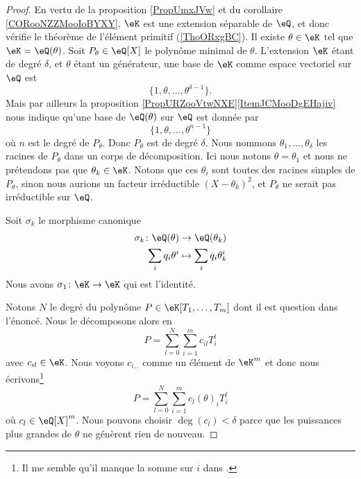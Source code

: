 \begin{proof}
    En vertu de la proposition \ref{PropUmxJVw} et du corollaire \ref{CORooNZZMooIoBYXY}, \( \eK\) est une extension séparable de \( \eQ\), et donc vérifie le théorème de l'élément primitif (\ref{ThoORxgBC}). Il existe \( \theta\in \eK\) tel que \( \eK=\eQ(\theta)\). Soit \( P_{\theta}\in\eQ[X]\) le polynôme minimal de \( \theta\). L'extension \( \eK\) étant de degré \( \delta\), et \( \theta\) étant un générateur, une base de \( \eK\) comme espace vectoriel sur \( \eQ\) est 
    \begin{equation}
        \{ 1,\theta,\ldots, \theta^{\delta-1} \}.
    \end{equation}
    Mais par ailleurs la proposition \ref{PropURZooVtwNXE}\ref{ItemJCMooDgEHajiv} nous indique qu'une base de \( \eQ(\theta)\) sur \( \eQ\) est donnée par
    \begin{equation}
        \{ 1,\theta,\ldots, \theta^{n-1} \}
    \end{equation}
    où \( n\) est le degré de \( P_{\theta}\). Donc \( P_{\theta}\) est de degré \( \delta\). Nous nommons \( \theta_1,\ldots, \theta_{\delta}\) les racines de \( P_{\theta}\) dans un corps de décomposition. Ici nous notons \( \theta=\theta_1\) et nous ne prétendons pas que \( \theta_k\in \eK\). Notons que ces \( \theta_i\) sont toutes des racines simples de \( P_{\theta}\), sinon nous aurions un facteur irréductible \( (X-\theta_k)^2\), et \( P_{\theta}\) ne serait pas irréductible sur \( \eQ\).

    Soit \( \sigma_k\) le morphisme canonique
    \begin{equation}
        \begin{aligned}
            \sigma_k\colon \eQ(\theta)&\to \eQ(\theta_k) \\
            \sum_i q_i\theta^i&\mapsto \sum_iq_i\theta_k^i 
        \end{aligned}
    \end{equation}
    Nous avons \( \sigma_1\colon \eK\to \eK\) qui est l'identité.

    Notons \( N\) le degré du polynôme \( P\in \eK[T_1,\ldots, T_m]\) dont il est question dans l'énoncé. Nous le décomposons alors en
    \begin{equation}
        P=\sum_{l=0}^N\sum_{i=1}^mc_{il}T_i^l
    \end{equation}
    avec \( c_{il}\in \eK\). Nous voyons \( c_{i,.}\) comme un élément de \( \eK^m\) et donc nous écrivons\footnote{Il me semble qu'il manque la somme sur \( i\) dans \cite{fJhCTE}.}
    \begin{equation}
        P=\sum_{l=0}^N\sum_{i=1}^m c_l(\theta)_iT_i^l
    \end{equation}
    où \( c_l\in \eQ[X]^m\). Nous pouvons choisir \( \deg(c_l)<\delta\) parce que les puissances plus grandes de \( \theta\) ne génèrent rien de nouveau.


\end{proof}
